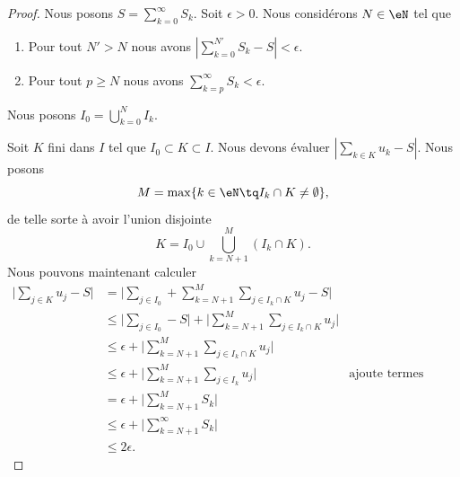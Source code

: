 \begin{proof}
	Nous posons \( S=\sum_{k=0}^{\infty}S_k\). Soit \( \epsilon>0\). Nous considérons \( N\in \eN\) tel que
	\begin{enumerate}
		\item
		      Pour tout \( N'>N\) nous avons \( | \sum_{k=0}^{N'}S_k-S |<\epsilon\).
		\item
		      Pour tout \( p\geq N\) nous avons \( \sum_{k=p}^{\infty}S_k<\epsilon\).
	\end{enumerate}
	Nous posons \( I_0=\bigcup_{k=0}^NI_k\).

	Soit \( K\) fini dans \( I\) tel que \(I_0\subset K\subset I \). Nous devons évaluer \( | \sum_{k\in K}u_k-S |\). Nous posons
	\begin{equation}
		M=\max\{ k\in \eN\tq I_k\cap K\neq \emptyset \},
	\end{equation}
	de telle sorte à avoir l'union disjointe
	\begin{equation}
		K=I_0\cup\bigcup_{k=N+1}^M(I_k\cap K).
	\end{equation}
	Nous pouvons maintenant calculer
	\begin{subequations}
		\begin{align}
			\big| \sum_{j\in K}u_j-S \big| & =\big| \sum_{j\in I_0}+\sum_{k=N+1}^M\sum_{j\in I_k\cap K}u_j-S \big|                                                \\
			                               & \leq\big| \sum_{j\in I_0}-S \big|+\big| \sum_{k=N+1}^M\sum_{j\in I_k\cap K}u_j \big|                                 \\
			                               & \leq \epsilon  +\big| \sum_{k=N+1}^M\sum_{j\in I_k\cap K}u_j \big|                                                   \\
			                               & \leq \epsilon  +\big| \sum_{k=N+1}^M\sum_{j\in I_k}u_j \big|                         & \text{ajoute termes positifs} \\
			                               & =\epsilon+\big| \sum_{k=N+1}^MS_k \big|                                                                              \\
			                               & \leq\epsilon+\big| \sum_{k=N+1}^{\infty}S_k \big|                                                                    \\
			                               & \leq 2\epsilon.
		\end{align}
	\end{subequations}
\end{proof}

